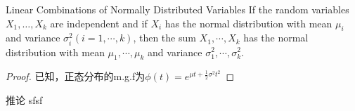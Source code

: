 \documentclass[../常见分布.tex]{subfiles}
\begin{document}
\begin{theorem}{Linear Combinations of Normally Distributed Variables}{}
If the random variables $X_1, \dots, X_k$ are independent and if $X_i$ has the normal distribution with mean $\mu_i$ and variance $\sigma_i^2(i=1,\cdots,k)$, then the sum $X_1, \cdots, X_k$ has the normal distribution with mean  $\mu_1, \cdots, \mu_k$ and variance $\sigma_1^2, \cdots, \sigma_k^2$.

\end{theorem}
\begin{proof}
已知，正态分布的m.g.f为$\phi(t)=e^{\mu t+\frac{1}{2}\sigma^2t^2}$
\end{proof}

\begin{corollary}{推论}{}
sfsf
\end{corollary}
\end{document}
